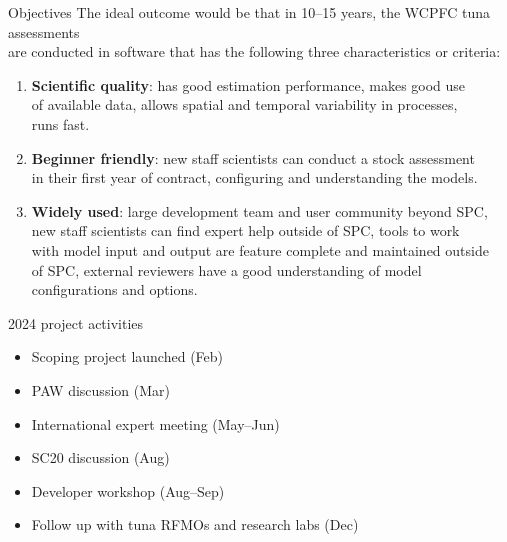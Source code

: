 \documentclass[aspectratio=169,fleqn]{beamer}
\begin{document}
\begin{frame}{Objectives}
  The ideal outcome would be that in 10--15 years, the WCPFC tuna assessments\\
  are conducted in software that has the following three characteristics or
  criteria:\\[1.5ex]
  \begin{enumerate}
    \item {\bf\blue Scientific quality}: has good estimation performance, makes
    good use\\
    of available data, allows spatial and temporal variability in processes,\\
    runs fast.\\[1.5ex]
    \item {\bf\blue Beginner friendly}: new staff scientists can conduct a stock
    assessment\\
    in their first year of contract, configuring and understanding the
    models.\\[1.5ex]
    \item {\bf\blue Widely used}: large development team and user community
    beyond SPC,\\
    new staff scientists can find expert help outside of SPC, tools
    to work\\
    with model input and output are feature complete and maintained
    outside\\
    of SPC, external reviewers have a good understanding of model\\
    configurations and options.\\[2ex]
  \end{enumerate}
\end{frame}


\begin{frame}{2024 project activities}
  \begin{itemize}
    \item[] Scoping project launched (Feb)\\[3ex]
    \item[] PAW discussion (Mar)\\[3ex]
    \item[] International expert meeting (May--Jun)\\[3ex]
    \item[] SC20 discussion (Aug)\\[3ex]
    \item[] Developer workshop (Aug--Sep)\\[3ex]
    \item[] Follow up with tuna RFMOs and research labs (Dec)\\[2ex]
  \end{itemize}
\end{frame}
\end{document}
